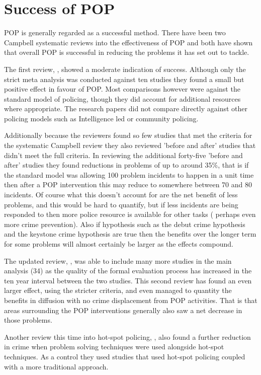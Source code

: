 \section{Success of POP} POP is generally regarded as a successful method. There have been two Campbell systematic reviews into the effectiveness of POP and both have shown that overall POP is successful in reducing the problems it has set out to tackle. 

The first review, \parencite{popeffective}, showed a moderate indication of success. Although only the strict meta analysis was conducted against ten studies they found a small but positive effect in favour of POP. Most comparisons however were against the standard model of policing, though they did account for additional resources where appropriate. The research papers did not compare directly against other policing models such as Intelligence led or community policing.  

Additionally because the reviewers found so few studies that met the criteria for the systematic Campbell review they also reviewed 'before and after' studies that didn't meet the full criteria.  In reviewing the additional forty-five 'before and after' studies they found reductions in problems of up to around 35\%, that is if the standard model was allowing 100 problem incidents to happen in a unit time then after a POP intervention this may reduce to somewhere between 70 and 80 incidents. Of course what this doesn't account for are the net benefit of less problems, and this would be hard to quantify, but if less incidents are being responded to then more police resource is available for other tasks ( perhaps even more crime prevention). Also if hypothesis such as the debut crime hypothesis and the keystone crime hypothesis  \parencite{farrell2015debuts} are true then the benefits over the longer term for some problems will almost certainly be larger as the effects compound. 

The updated review,  \parencite{hinkle2020problem}, was able to include many more studies in the main analysis (34) as the quality of the formal evaluation process has increased in the ten year interval between the two studies. This second review has found an even larger effect, using the stricter criteria,  and even managed to quantity the benefits in diffusion with no crime displacement from POP activities. That is that areas surrounding the POP interventions generally also saw a net decrease in those problems. 

Another review this time into hot-spot policing, \parencite{braga2014effects}, also found a further reduction in crime when problem solving techniques were used alongside hot-spot techniques. As a control they used studies that used hot-spot policing coupled with a more traditional approach. 

